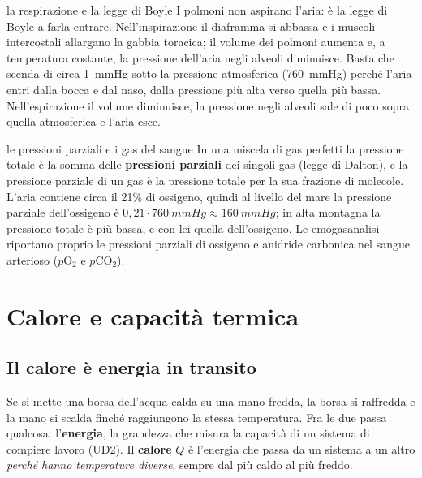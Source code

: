 

\begin{applicazione}{la respirazione e la legge di Boyle}
I polmoni non aspirano l'aria: è la legge di Boyle a farla entrare. Nell'inspirazione il diaframma si abbassa e i muscoli intercostali allargano la gabbia toracica; il volume dei polmoni aumenta e, a temperatura costante, la pressione dell'aria negli alveoli diminuisce. Basta che scenda di circa \SI{1}{mmHg} sotto la pressione atmosferica (\SI{760}{mmHg}) perché l'aria entri dalla bocca e dal naso, dalla pressione più alta verso quella più bassa. Nell'espirazione il volume diminuisce, la pressione negli alveoli sale di poco sopra quella atmosferica e l'aria esce.
\end{applicazione}



\begin{approfondimento}{le pressioni parziali e i gas del sangue}
In una miscela di gas perfetti la pressione totale è la somma delle \textbf{pressioni parziali} dei singoli gas (legge di Dalton), e la pressione parziale di un gas è la pressione totale per la sua frazione di molecole. L'aria contiene circa il 21\% di ossigeno, quindi al livello del mare la pressione parziale dell'ossigeno è $0{,}21 \cdot \SI{760}{mmHg} \approx \SI{160}{mmHg}$; in alta montagna la pressione totale è più bassa, e con lei quella dell'ossigeno. Le emogasanalisi riportano proprio le pressioni parziali di ossigeno e anidride carbonica nel sangue arterioso ($p\mathrm{O_2}$ e $p\mathrm{CO_2}$).
\end{approfondimento}

\section{Calore e capacità termica}
\label{sec:ud5-calore}

\subsection{Il calore è energia in transito}

Se si mette una borsa dell'acqua calda su una mano fredda, la borsa si raffredda e la mano si scalda finché raggiungono la stessa temperatura. Fra le due passa qualcosa: l'\textbf{energia}, la grandezza che misura la capacità di un sistema di compiere lavoro (UD2). Il \textbf{calore} $Q$ è l'energia che passa da un sistema a un altro \emph{perché hanno temperature diverse}, sempre dal più caldo al più freddo.

